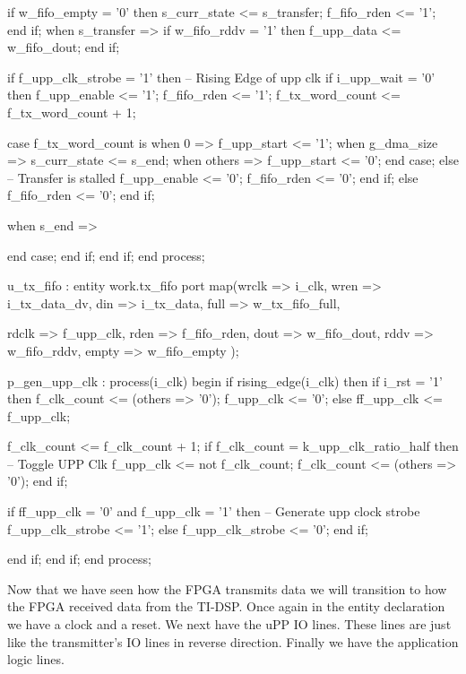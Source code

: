 \begin{VHDLlisting}[tabsize=2]
						if w_fifo_empty = '0' then
							s_curr_state <= s_transfer;
							f_fifo_rden <= '1';
						end if;					
					when s_transfer => 
						if w_fifo_rddv = '1' then
							f_upp_data <= w_fifo_dout;
						end if;
						
						if f_upp_clk_strobe = '1' then
							-- Rising Edge of upp clk
							if i_upp_wait = '0' then
								f_upp_enable <= '1';
								f_fifo_rden <= '1';
								f_tx_word_count <= f_tx_word_count + 1;
							
								case f_tx_word_count is
									when 0 => 
										f_upp_start <= '1';
									when g_dma_size => 
										s_curr_state <= s_end;
									when others =>
										f_upp_start <= '0';
								end case;			
							else
								-- Transfer is stalled
								f_upp_enable <= '0';
								f_fifo_rden <= '0';
							end if;							
						else
							f_fifo_rden <= '0';
						end if;
					
					when s_end => 
				
				end case;
			end if;
		end if;
	end process;
	
	
	u_tx_fifo : entity work.tx_fifo
	port map(wrclk => i_clk, 
			 wren  => i_tx_data_dv,
			 din   => i_tx_data,
			 full  => w_tx_fifo_full,
	
			 rdclk => f_upp_clk,
			 rden  => f_fifo_rden,
			 dout  => w_fifo_dout,
			 rddv  => w_fifo_rddv,
			 empty => w_fifo_empty	
	);
	
	p_gen_upp_clk : process(i_clk)
	begin
		if rising_edge(i_clk) then
			if i_rst = '1' then
				f_clk_count <= (others => '0');
				f_upp_clk <= '0';
			else
				ff_upp_clk <= f_upp_clk;
			
				f_clk_count <= f_clk_count + 1;
				if f_clk_count = k_upp_clk_ratio_half then
					-- Toggle UPP Clk
					f_upp_clk <= not f_clk_count;
					f_clk_count <= (others => '0');
				end if;
				
				if ff_upp_clk = '0' and f_upp_clk = '1' then
					-- Generate upp clock strobe
					f_upp_clk_strobe <= '1';
				else
					f_upp_clk_strobe <= '0';
				end if;
				
			end if;
		end if;	
	end process;
\end{VHDLlisting}

Now that we have seen how the \ac{FPGA} transmits data we will transition to how the \ac{FPGA} received data from the \ac{TI}-\ac{DSP}. Once again in the entity declaration we have a clock and a reset. We next have the \ac{uPP} \ac{IO} lines. These lines are just like the transmitter's \ac{IO} lines in reverse direction. Finally we have the application logic lines. 

